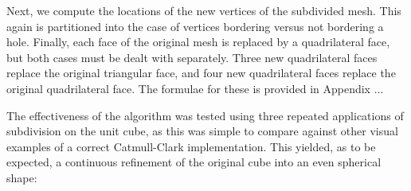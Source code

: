 \documentclass[10pt,a4paper]{article}
\begin{document}
Next, we compute the locations of the new vertices of the subdivided mesh. This again is partitioned into the case of vertices bordering versus not bordering a hole. Finally, each face of the original mesh is replaced by a quadrilateral face, but both cases must be dealt with separately.  Three new quadrilateral faces replace the original triangular face, and four new quadrilateral faces replace the original quadrilateral face. The formulae for these is provided in Appendix ...

The effectiveness of the algorithm was tested using three repeated applications of subdivision on the unit cube, as this was simple to compare against other visual examples of a correct Catmull-Clark implementation. This yielded, as to be expected, a continuous refinement of the original cube into an even spherical shape:
\end{document}
